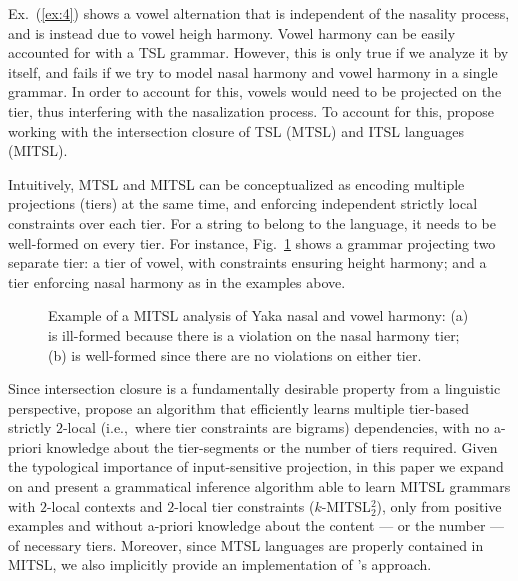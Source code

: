 \documentclass[11pt,a4paper]{article}
\begin{document}
\begin{exe}
    \ex\label{ex:4}\begin{xlist}
    	 \ex\label{ex:4a}    
	 \ex\label{ex:4b} 
	\end{xlist}
\end{exe}

Ex.~(\ref{ex:4}) shows a vowel alternation that is independent of the nasality process, and is instead due to vowel heigh harmony.
Vowel harmony can be easily accounted for with a TSL grammar.
However, this is only true if we analyze it by itself, and fails if we try to model nasal harmony and vowel harmony in a single grammar.
In order to account for this, vowels would need to be projected on the tier, thus interfering with the nasalization process.
To account for this, \citet{desanto2019structure} propose  working with the intersection closure of TSL (MTSL) and ITSL languages (MITSL).

Intuitively, MTSL and MITSL can be conceptualized as encoding multiple projections (tiers) at the same time, and enforcing independent strictly local constraints over each tier.
For a string to belong to the language, it needs to be well-formed on every tier.
For instance, Fig.~\ref{fig:YAKA3} shows a grammar projecting two separate tier: a tier of vowel, with constraints ensuring height harmony; and a tier enforcing nasal harmony as in the examples above.


\begin{figure}[]
\begin{center}
       
    
        \end{center}
        \caption{Example of a MITSL analysis of  Yaka nasal and vowel harmony: (a) is ill-formed because there is a violation on the nasal harmony tier; (b) is well-formed since there are no violations on either tier.}
        \label{fig:YAKA3}
        \end{figure}


Since intersection closure is a fundamentally desirable property from a linguistic perspective, \citet{McMullinSCIL2019} propose an algorithm that efficiently learns multiple tier-based strictly $2$-local  (i.e.,~where tier constraints are bigrams) dependencies, with no a-priori knowledge about the tier-segments or the number of tiers required.
Given the typological importance of input-sensitive projection, in this paper we expand on \citet{McMullinSCIL2019} and present a grammatical inference algorithm able to learn MITSL grammars with $2$-local contexts and $2$-local tier constraints ($k$-MITSL$^2_2$), only from positive examples and without a-priori knowledge about the content --- or the number --- of necessary tiers.
Moreover, since MTSL languages are properly contained in MITSL, we also implicitly provide an implementation of  \citet{McMullinSCIL2019}'s approach.
\end{document}
